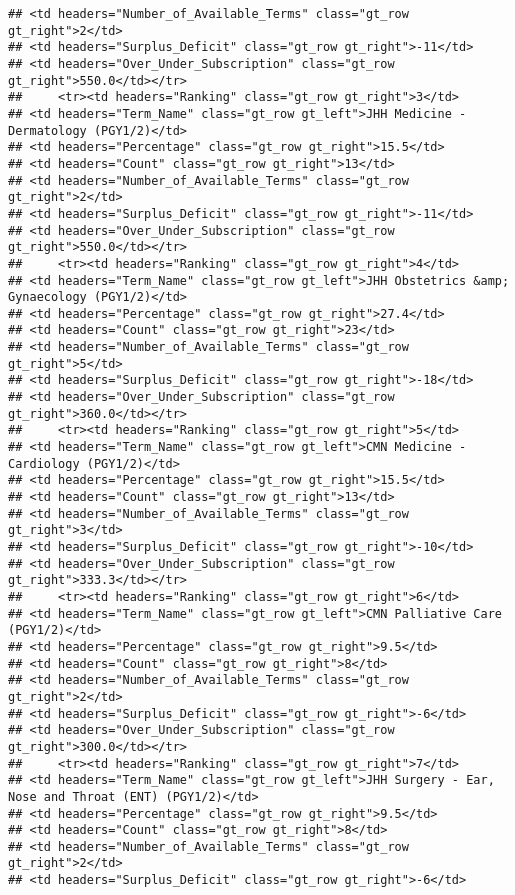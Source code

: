 \documentclass[
]{article}
\begin{document}
\begin{verbatim}
## <td headers="Number_of_Available_Terms" class="gt_row gt_right">2</td>
## <td headers="Surplus_Deficit" class="gt_row gt_right">-11</td>
## <td headers="Over_Under_Subscription" class="gt_row gt_right">550.0</td></tr>
##     <tr><td headers="Ranking" class="gt_row gt_right">3</td>
## <td headers="Term_Name" class="gt_row gt_left">JHH Medicine - Dermatology (PGY1/2)</td>
## <td headers="Percentage" class="gt_row gt_right">15.5</td>
## <td headers="Count" class="gt_row gt_right">13</td>
## <td headers="Number_of_Available_Terms" class="gt_row gt_right">2</td>
## <td headers="Surplus_Deficit" class="gt_row gt_right">-11</td>
## <td headers="Over_Under_Subscription" class="gt_row gt_right">550.0</td></tr>
##     <tr><td headers="Ranking" class="gt_row gt_right">4</td>
## <td headers="Term_Name" class="gt_row gt_left">JHH Obstetrics &amp; Gynaecology (PGY1/2)</td>
## <td headers="Percentage" class="gt_row gt_right">27.4</td>
## <td headers="Count" class="gt_row gt_right">23</td>
## <td headers="Number_of_Available_Terms" class="gt_row gt_right">5</td>
## <td headers="Surplus_Deficit" class="gt_row gt_right">-18</td>
## <td headers="Over_Under_Subscription" class="gt_row gt_right">360.0</td></tr>
##     <tr><td headers="Ranking" class="gt_row gt_right">5</td>
## <td headers="Term_Name" class="gt_row gt_left">CMN Medicine - Cardiology (PGY1/2)</td>
## <td headers="Percentage" class="gt_row gt_right">15.5</td>
## <td headers="Count" class="gt_row gt_right">13</td>
## <td headers="Number_of_Available_Terms" class="gt_row gt_right">3</td>
## <td headers="Surplus_Deficit" class="gt_row gt_right">-10</td>
## <td headers="Over_Under_Subscription" class="gt_row gt_right">333.3</td></tr>
##     <tr><td headers="Ranking" class="gt_row gt_right">6</td>
## <td headers="Term_Name" class="gt_row gt_left">CMN Palliative Care (PGY1/2)</td>
## <td headers="Percentage" class="gt_row gt_right">9.5</td>
## <td headers="Count" class="gt_row gt_right">8</td>
## <td headers="Number_of_Available_Terms" class="gt_row gt_right">2</td>
## <td headers="Surplus_Deficit" class="gt_row gt_right">-6</td>
## <td headers="Over_Under_Subscription" class="gt_row gt_right">300.0</td></tr>
##     <tr><td headers="Ranking" class="gt_row gt_right">7</td>
## <td headers="Term_Name" class="gt_row gt_left">JHH Surgery - Ear, Nose and Throat (ENT) (PGY1/2)</td>
## <td headers="Percentage" class="gt_row gt_right">9.5</td>
## <td headers="Count" class="gt_row gt_right">8</td>
## <td headers="Number_of_Available_Terms" class="gt_row gt_right">2</td>
## <td headers="Surplus_Deficit" class="gt_row gt_right">-6</td>

\end{verbatim}
\end{document}
